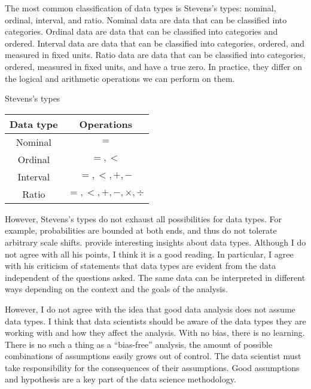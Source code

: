 The most common classification of data types is Stevens’s types: nominal, ordinal,
interval, and ratio.  Nominal data are data that can be classified into categories.
Ordinal data are data that can be classified into categories and ordered.  Interval data
are data that can be classified into categories, ordered, and measured in fixed units.
Ratio data are data that can be classified into categories, ordered, measured in fixed
units, and have a true zero.  In practice, they differ on the logical and arithmetic operations
we can perform on them.

\begin{tablebox}{Stevens’s types}
  \centering
  \begin{tabular}{cc}
    \toprule
    \textbf{Data type} & \textbf{Operations} \\
    \midrule
    Nominal & $=$ \\
    Ordinal & $=, <$ \\
    Interval & $=, <, +, - $ \\
    Ratio & $=, <, +, -, \times, \div$ \\
    \bottomrule
  \end{tabular}
\end{tablebox}

However, Stevens’s types do not exhaust all possibilities for data types.  For example,
probabilities are bounded at both ends, and thus do not tolerate arbitrary scale shifts.
\textcite{Paul1993} provide interesting insights about data types.  Although I do not
agree with all his points, I think it is a good reading.  In particular, I agree with
his criticism of statements that data types are evident from the data independent of the
questions asked.  The same data can be interpreted in different ways depending on the
context and the goals of the analysis.

However, I do not agree with the idea that good data analysis does not assume data types.
I think that data scientists should be aware of the data types they are working with and
how they affect the analysis.  With no bias, there is no learning.  There is no such a
thing as a ``bias-free'' analysis, the amount of possible combinations of assumptions
easily grows out of control.  The data scientist must take responsibility for the
consequences of their assumptions.  Good assumptions and hypothesis are a key part of the
data science methodology.

